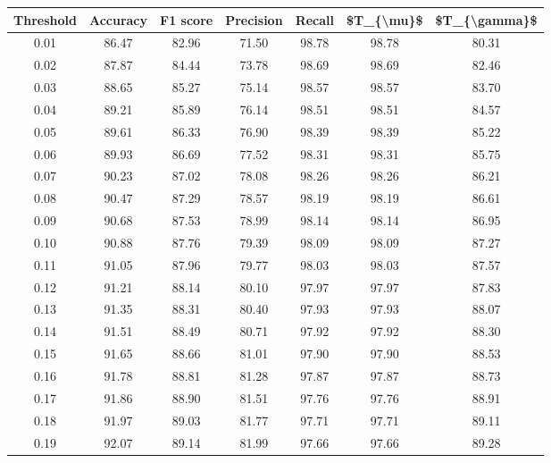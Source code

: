 \begin{tabular}{|c|c|c|c|c|c|c|}
\hline
 Threshold &  Accuracy &  F1 score &  Precision &  Recall &  \$T\_\{\textbackslash mu\}\$ &  \$T\_\{\textbackslash gamma\}\$ \\
\hline
      0.01 &     86.47 &     82.96 &      71.50 &   98.78 &      98.78 &         80.31 \\
      0.02 &     87.87 &     84.44 &      73.78 &   98.69 &      98.69 &         82.46 \\
      0.03 &     88.65 &     85.27 &      75.14 &   98.57 &      98.57 &         83.70 \\
      0.04 &     89.21 &     85.89 &      76.14 &   98.51 &      98.51 &         84.57 \\
      0.05 &     89.61 &     86.33 &      76.90 &   98.39 &      98.39 &         85.22 \\
      0.06 &     89.93 &     86.69 &      77.52 &   98.31 &      98.31 &         85.75 \\
      0.07 &     90.23 &     87.02 &      78.08 &   98.26 &      98.26 &         86.21 \\
      0.08 &     90.47 &     87.29 &      78.57 &   98.19 &      98.19 &         86.61 \\
      0.09 &     90.68 &     87.53 &      78.99 &   98.14 &      98.14 &         86.95 \\
      0.10 &     90.88 &     87.76 &      79.39 &   98.09 &      98.09 &         87.27 \\
      0.11 &     91.05 &     87.96 &      79.77 &   98.03 &      98.03 &         87.57 \\
      0.12 &     91.21 &     88.14 &      80.10 &   97.97 &      97.97 &         87.83 \\
      0.13 &     91.35 &     88.31 &      80.40 &   97.93 &      97.93 &         88.07 \\
      0.14 &     91.51 &     88.49 &      80.71 &   97.92 &      97.92 &         88.30 \\
      0.15 &     91.65 &     88.66 &      81.01 &   97.90 &      97.90 &         88.53 \\
      0.16 &     91.78 &     88.81 &      81.28 &   97.87 &      97.87 &         88.73 \\
      0.17 &     91.86 &     88.90 &      81.51 &   97.76 &      97.76 &         88.91 \\
      0.18 &     91.97 &     89.03 &      81.77 &   97.71 &      97.71 &         89.11 \\
      0.19 &     92.07 &     89.14 &      81.99 &   97.66 &      97.66 &         89.28 \\

\end{tabular}
